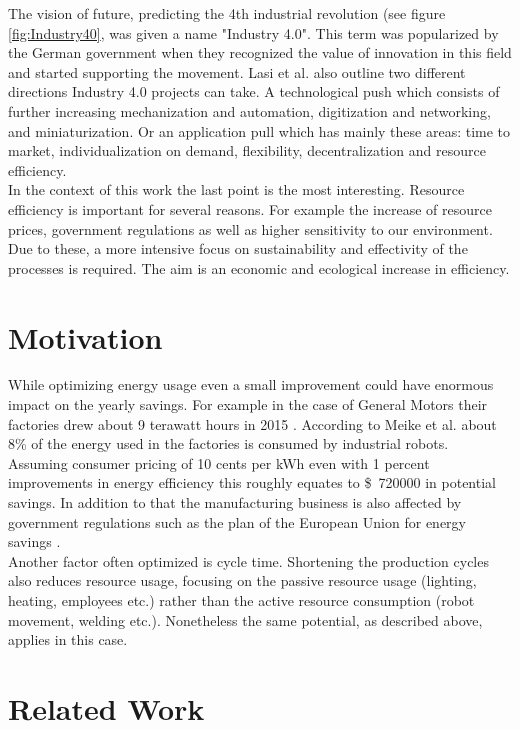 The vision of future, predicting the 4th industrial revolution (see figure \ref{fig:Industry40}, was given a name "Industry 4.0". This term was popularized by the German government when they recognized the value of innovation in this field and started supporting the movement. Lasi et al. \cite{Industry40} also outline two different directions Industry 4.0 projects can take. A technological push which consists of further increasing mechanization and automation, digitization and networking, and miniaturization. Or an application pull which has mainly these areas: time to market, individualization on demand, flexibility, decentralization and resource efficiency. \\

In the context of this work the last point is the most interesting.
Resource efficiency is important for several reasons.
For example the increase of resource prices, government regulations as well as higher sensitivity to our environment. Due to these, a more intensive focus on sustainability and effectivity of the processes is required. 
The aim is an economic and ecological increase in efficiency. 

\section{Motivation}

While optimizing energy usage even a small improvement could have enormous impact on the yearly savings. For example in the case of General Motors their factories drew about 9 terawatt hours in 2015 \cite{GMEnergySpending}. According to Meike et al. \cite{Meike8Percent} about 8\% of the energy used in the factories is consumed by industrial robots. Assuming consumer pricing of 10 cents per kWh even with 1 percent improvements in energy efficiency this roughly equates to \$~720000 in potential savings. In addition to that the manufacturing business is also affected by government regulations such as the plan of the European Union for energy savings \cite{EUElectricity}. \\

Another factor often optimized is cycle time. Shortening the production cycles also reduces resource usage, focusing on the passive resource usage (lighting, heating, employees etc.) rather than the active resource consumption (robot movement, welding etc.). Nonetheless the same potential, as described above, applies in this case. \\

\section{Related Work}

